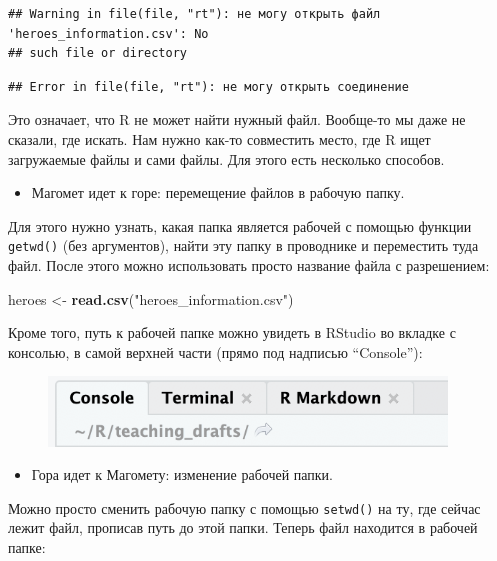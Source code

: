 \documentclass[]{book}
\newenvironment{Shaded}{\begin{snugshade}}{\end{snugshade}}
\newcommand{\KeywordTok}[1]{\textcolor[rgb]{0.13,0.29,0.53}{\textbf{#1}}}
\newcommand{\StringTok}[1]{\textcolor[rgb]{0.31,0.60,0.02}{#1}}
\newcommand{\NormalTok}[1]{#1}
\providecommand{\tightlist}{%
  \setlength{\itemsep}{0pt}\setlength{\parskip}{0pt}}
\begin{document}
\begin{verbatim}
## Warning in file(file, "rt"): не могу открыть файл 'heroes_information.csv': No
## such file or directory
\end{verbatim}

\begin{verbatim}
## Error in file(file, "rt"): не могу открыть соединение
\end{verbatim}

Это означает, что R не может найти нужный файл. Вообще-то мы даже не
сказали, где искать. Нам нужно как-то совместить место, где R ищет
загружаемые файлы и сами файлы. Для этого есть несколько способов.

\begin{itemize}
\tightlist
\item
  Магомет идет к горе: перемещение файлов в рабочую папку.
\end{itemize}

Для этого нужно узнать, какая папка является рабочей с помощью функции
\texttt{getwd()} (без аргументов), найти эту папку в проводнике и
переместить туда файл. После этого можно использовать просто название
файла с разрешением:

\begin{Shaded}
\begin{Highlighting}[]
\NormalTok{heroes <-}\StringTok{ }\KeywordTok{read.csv}\NormalTok{(}\StringTok{"heroes_information.csv"}\NormalTok{)}
\end{Highlighting}
\end{Shaded}

Кроме того, путь к рабочей папке можно увидеть в RStudio во вкладке с
консолью, в самой верхней части (прямо под надписью ``Console''):

\begin{figure}
\centering
\includegraphics[width=4.16667in]{images/Console_wd.png}
\caption{}
\end{figure}

\begin{itemize}
\tightlist
\item
  Гора идет к Магомету: изменение рабочей папки.
\end{itemize}

Можно просто сменить рабочую папку с помощью \texttt{setwd()} на ту, где
сейчас лежит файл, прописав путь до этой папки. Теперь файл находится в
рабочей папке:
\end{document}
